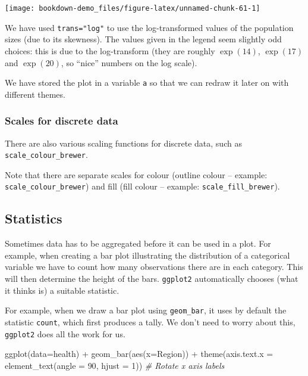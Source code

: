 \documentclass[
]{book}
\newenvironment{Shaded}{\begin{snugshade}}{\end{snugshade}}
\newcommand{\AttributeTok}[1]{\textcolor[rgb]{0.77,0.63,0.00}{#1}}
\newcommand{\CommentTok}[1]{\textcolor[rgb]{0.56,0.35,0.01}{\textit{#1}}}
\newcommand{\DecValTok}[1]{\textcolor[rgb]{0.00,0.00,0.81}{#1}}
\newcommand{\FunctionTok}[1]{\textcolor[rgb]{0.00,0.00,0.00}{#1}}
\newcommand{\NormalTok}[1]{#1}
\newcommand{\SpecialCharTok}[1]{\textcolor[rgb]{0.00,0.00,0.00}{#1}}
\begin{document}
\texttt{[image: bookdown-demo\_files/figure-latex/unnamed-chunk-61-1]}

We have used \texttt{trans="log"} to use the log-transformed values of the population sizes (due to its skewness). The values given in the legend seem slightly odd choices: this is due to the log-transform (they are roughly \(\exp(14)\), \(\exp(17)\) and \(\exp(20)\), so ``nice'' numbers on the log scale).

We have stored the plot in a variable \texttt{a} so that we can redraw it later on with different themes.

\hypertarget{scales-for-discrete-data}{%
\subsubsection{Scales for discrete data}\label{scales-for-discrete-data}}

There are also various scaling functions for discrete data, such as \texttt{scale\_colour\_brewer}.

Note that there are separate scales for colour (outline colour -- example: \texttt{scale\_colour\_brewer}) and fill (fill colour -- example: \texttt{scale\_fill\_brewer}).

\hypertarget{statistics}{%
\subsection{Statistics}\label{statistics}}

Sometimes data has to be aggregated before it can be used in a plot. For example, when creating a bar plot illustrating the distribution of a categorical variable we have to count how many observations there are in each category. This will then determine the height of the bars. \texttt{ggplot2} automatically chooses (what it thinks is) a suitable statistic.

For example, when we draw a bar plot using \texttt{geom\_bar}, it uses by default the statistic \texttt{count}, which first produces a tally. We don't need to worry about this, \texttt{ggplot2} does all the work for us.

\begin{Shaded}
\begin{Highlighting}[]
\FunctionTok{ggplot}\NormalTok{(}\AttributeTok{data=}\NormalTok{health) }\SpecialCharTok{+}
    \FunctionTok{geom\_bar}\NormalTok{(}\FunctionTok{aes}\NormalTok{(}\AttributeTok{x=}\NormalTok{Region)) }\SpecialCharTok{+}
    \FunctionTok{theme}\NormalTok{(}\AttributeTok{axis.text.x =} \FunctionTok{element\_text}\NormalTok{(}\AttributeTok{angle =} \DecValTok{90}\NormalTok{, }\AttributeTok{hjust =} \DecValTok{1}\NormalTok{)) }\CommentTok{\# Rotate x axis labels}
\end{Highlighting}
\end{Shaded}
\end{document}
